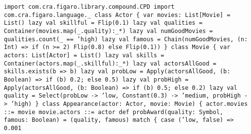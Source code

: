 \begin{flushleft}
\texttt{import com.cra.figaro.library.compound.CPD
\newline import com.cra.figaro.language.\_
\newline 
\newline class Actor \{
\newline \tab var movies: List[Movie] = List()
\newline \tab lazy val skillful = Flip(0.1)
\newline \tab lazy val qualities = Container(movies.map(_.quality):_*)
\newline \tab lazy val numGoodMovies = qualities.count(_ == 'high)
\newline \tab lazy val famous = Chain(numGoodMovies, (n: Int) => if (n >= 2) Flip(0.8) else Flip(0.1))
\newline \}
\newline 
\newline class Movie \{
\newline \tab var actors: List[Actor] = List()
\newline \tab lazy val skills = Container(actors.map(_.skillful):_*)
\newline \tab lazy val actorsAllGood = skills.exists(b => b)
\newline lazy val probLow = 
\newline Apply(actorsAllGood, (b: Boolean) => if (b) 0.2; else 0.5)
\newline lazy val probHigh = 
\newline Apply(actorsAllGood, (b: Boolean) => if (b) 0.5; else 0.2)
\newline lazy val quality = 
\newline Select(probLow -> 'low, Constant(0.3) -> 'medium, probHigh -> 'high)
\newline \}
\newline 
\newline class Appearance(actor: Actor, movie: Movie) \{
\newline \tab actor.movies ::= movie
\newline \tab movie.actors ::= actor
\newline 
\newline \tab def probAward(quality: Symbol, famous: Boolean) =
\newline \tab \tab (quality, famous) match \{
\newline \tab \tab case ('low, false) => 0.001
}
\end{flushleft}
